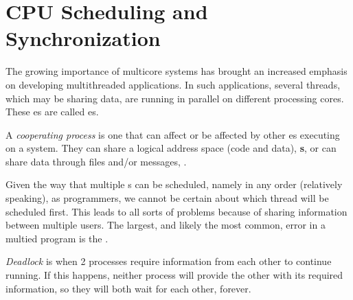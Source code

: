 \section{CPU Scheduling and Synchronization}\label{sec:CPU_Scheduling_Synchronization}
The growing importance of multicore systems has brought an increased emphasis on developing multithreaded applications.
In such applications, several threads, which may be sharing data, are running in parallel on different processing cores.
These es are called es.

\begin{definition}\label{def:Cooperating_Process}
  A \emph{cooperating process} is one that can affect or be affected by other es executing on a system.
  They can share a logical address space (code and data), \textbf{s}, or can share data through files and/or messages, \textbf{}.
\end{definition}

Given the way that multiple s can be scheduled, namely in any order (relatively speaking), as programmers, we cannot be certain about which thread will be scheduled first.
This leads to all sorts of problems because of sharing information between multiple users.
The largest, and likely the most common, error in a multied program is the .


\begin{definition}[Deadlock]\label{def:Deadlock}
  \emph{Deadlock} is when 2 processes require information from each other to continue running.
  If this happens, neither process will provide the other with its required information, so they will both wait for each other, forever.
\end{definition}

